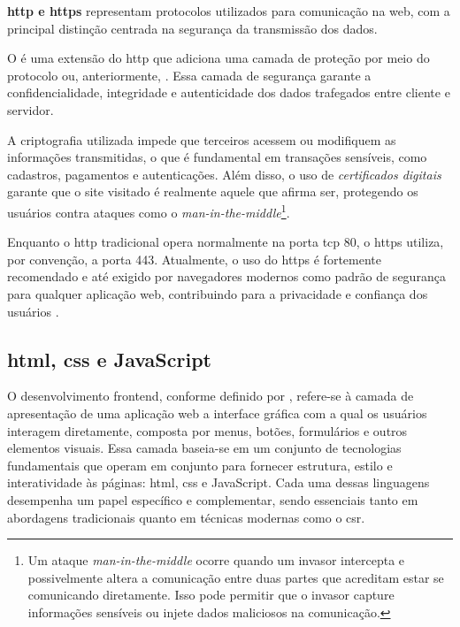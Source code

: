 \textbf{\acrshort{http} e \acrshort{https}} representam protocolos utilizados para comunicação na web, com a principal distinção centrada na segurança da transmissão dos dados.

O \textbf{} é uma extensão do \acrshort{http} que adiciona uma camada de proteção por meio do protocolo  ou, anteriormente, . Essa camada de segurança garante a confidencialidade, integridade e autenticidade dos dados trafegados entre cliente e servidor. 

A criptografia utilizada impede que terceiros acessem ou modifiquem as informações transmitidas, o que é fundamental em transações sensíveis, como cadastros, pagamentos e autenticações. Além disso, o uso de \textit{certificados digitais} garante que o site visitado é realmente aquele que afirma ser, protegendo os usuários contra ataques como o \textit{man-in-the-middle}\footnote{Um ataque \textit{man-in-the-middle} ocorre quando um invasor intercepta e possivelmente altera a comunicação entre duas partes que acreditam estar se comunicando diretamente. Isso pode permitir que o invasor capture informações sensíveis ou injete dados maliciosos na comunicação.\cite{wikipedia_man_in_the_middle}}.

Enquanto o \acrshort{http} tradicional opera normalmente na porta \acrshort{tcp} 80, o \acrshort{https} utiliza, por convenção, a porta 443. Atualmente, o uso do \acrshort{https} é fortemente recomendado e até exigido por navegadores modernos como padrão de segurança para qualquer aplicação web, contribuindo para a privacidade e confiança dos usuários \cite{wikipedia_http}.

\subsection{\acrshort{html}, \acrshort{css} e JavaScript}
\label{subsec:html-css-js}


O desenvolvimento frontend, conforme definido por , refere-se à camada de apresentação de uma aplicação web a interface gráfica com a qual os usuários interagem diretamente, composta por menus, botões, formulários e outros elementos visuais. Essa camada baseia-se em um conjunto de tecnologias fundamentais que operam em conjunto para fornecer estrutura, estilo e interatividade às páginas: \acrshort{html}, \acrshort{css} e JavaScript. Cada uma dessas linguagens desempenha um papel específico e complementar, sendo essenciais tanto em abordagens tradicionais quanto em técnicas modernas como o \acrshort{csr}.


